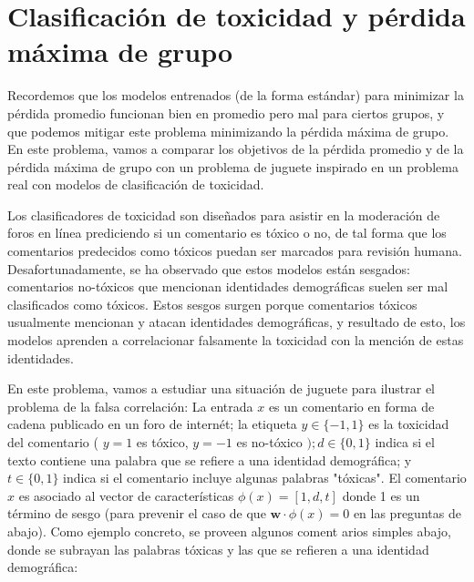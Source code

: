 \documentclass{article}
\begin{document}
\section{Clasificación de toxicidad y pérdida máxima de grupo}
 Recordemos que los modelos entrenados (de la forma estándar) para minimizar la pérdida promedio funcionan bien en promedio pero mal para ciertos grupos, y que podemos mitigar este problema minimizando la pérdida máxima de grupo. En este problema, vamos a comparar los objetivos de la pérdida promedio y de la pérdida máxima de grupo con un problema de juguete inspirado en un problema real con modelos de clasificación de toxicidad.

Los clasificadores de toxicidad son diseñados para asistir en la moderación de foros en línea prediciendo si un comentario es tóxico o no, de tal forma que los comentarios predecidos como tóxicos puedan ser marcados para revisión humana. Desafortunadamente, se ha observado que estos modelos están sesgados: comentarios no-tóxicos que mencionan identidades demográficas suelen ser mal clasificados como tóxicos. Estos sesgos surgen porque comentarios tóxicos usualmente mencionan y atacan identidades demográficas, y resultado de esto, los modelos aprenden a correlacionar falsamente la toxicidad con la mención de estas identidades.

En este problema, vamos a estudiar una situación de juguete para ilustrar el problema de la falsa correlación: La entrada $x$ es un comentario en forma de cadena publicado en un foro de internét; la etiqueta $y \in\{-1,1\}$ es la toxicidad del comentario ( $y=1$ es tóxico, $y=-1$ es no-tóxico $) ; d \in\{0,1\}$ indica si el texto contiene una palabra que se refiere a una identidad demográfica; y $t \in\{0,1\}$ indica si el comentario incluye algunas palabras "tóxicas". El comentario $x$ es asociado al vector de características $\phi(x)=[1, d, t]$ donde 1 es un término de sesgo (para prevenir el caso de que $\boldsymbol{w} \cdot \phi(x)=0$ en las preguntas de abajo). Como ejemplo concreto, se proveen algunos coment arios simples abajo, donde se subrayan las palabras tóxicas y las que se refieren a una identidad demográfica:
\end{document}
